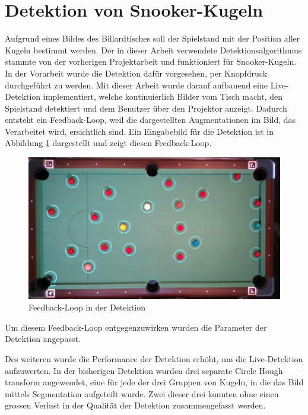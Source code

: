 \newpage
\section{Detektion von Snooker-Kugeln}\label{kap:detektion}
Aufgrund eines Bildes des Billardtisches soll der Spielstand mit der Position aller Kugeln bestimmt werden.
Der in dieser Arbeit verwendete Detektionsalgorithmus stammte von der vorherigen Projektarbeit\cite{project2:snooker_detection}
und funktioniert für Snooker-Kugeln.
In der Vorarbeit wurde die Detektion dafür vorgesehen, per Knopfdruck durchgeführt zu werden.
Mit dieser Arbeit wurde darauf aufbauend eine Live-Detektion implementiert, welche kontinuierlich Bilder vom Tisch macht,
den Spielstand detektiert und dem Benutzer über den Projektor anzeigt.
Dadurch entsteht ein Feedback-Loop, weil die dargestellten Augmentationen im Bild, das Verarbeitet wird, ersichtlich sind.
Ein Eingabebild für die Detektion ist in Abbildung \ref{fig:detection_feedback_loop} dargestellt und zeigt diesen Feedback-Loop.

\begin{figure}[h!]
    \begin{center}
        \includegraphics[width=0.8\linewidth]{../common/03_billiard_ai/resources/detection_feedback_loop.png}
    \end{center}
    \caption{Feedback-Loop in der Detektion}
    \label{fig:detection_feedback_loop}
\end{figure}

Um diesem Feedback-Loop entgegenzuwirken wurden die Parameter der Detektion angepasst.

Des weiteren wurde die Performance der Detektion erhöht, um die Live-Detektion aufzuwerten.
In der bisherigen Detektion wurden drei separate Circle Hough transform\cite{wiki:circle_hough} angewendet, eine für
jede der drei Gruppen von Kugeln, in die das Bild mittels Segmentation aufgeteilt wurde\cite{project2:snooker_detection}.
Zwei dieser drei konnten ohne einen grossen Verlust in der Qualität der Detektion zusammengefasst werden.

